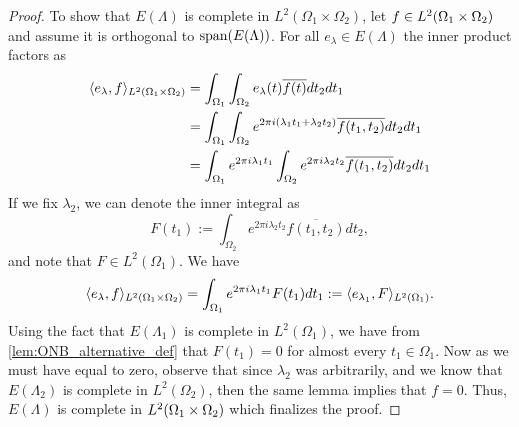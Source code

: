 \documentclass[../thesis.tex]{subfiles}
\begin{document}
\begin{proof}
    To show that $E(\Lambda)$ is complete in $L^2(\Omega_1 \times \Omega_2)$, let $f\in L^2(\Omega_1 \times \Omega_2)$ and assume it is orthogonal to $\operatorname{span}(E(\Lambda))$. For all $e_\lambda \in E(\Lambda)$ the inner product factors as
    \begin{align*} %
        \braa{e_\lambda,f}_{L^2\brac{\Omega_1 \times \Omega_2}}
        &= \int_{\Omega_1} \int_{\Omega_2} e_\lambda(t) \overline{f(t)} dt_2dt_1 \\
        &= \int_{\Omega_1} \int_{\Omega_2} e^{2\pi i  (\lambda_1 t_1 + \lambda_2 t_2)} \overline{f(t_1,t_2)} dt_2 dt_1 \\
        &= \int_{\Omega_1} e^{2 \pi i \lambda_1 t_1} \int_{\Omega_2}e^{2 \pi i \lambda_2 t_2} \overline{f(t_1,t_2)} dt_2 dt_1 \\
    \end{align*}
    If we fix $\lambda_2$, we can denote the inner integral as 
    \begin{equation}\label{eq:inner_eq}
        F(t_1) := \int_{\Omega_2} e^{2 \pi i \lambda_2 t_2} \overline{f(t_1,t_2)} dt_2,
    \end{equation}
    and note that $F\in L^2(\Omega_1)$. We have 
    \begin{equation}\label{eq:outter_eq}
        \langle e_{\lambda}, f\rangle_{L^2(\Omega_1\times \Omega_2)} = \int_{\Omega_1} e^{2 \pi i \lambda_1 t_1} F(t_1) dt_1 := \langle e_{\lambda_1}, F\rangle_{L^2(\Omega_1)}.
    \end{equation}
    Using the fact that $E(\Lambda_1)$ is complete in $L^2(\Omega_1)$, we have from \cref{lem:ONB_alternative_def} that $F(t_1)=0$ for almost every $t_1 \in \Omega_1$. Now as we must have  equal to zero, observe that since $\lambda_2$ was arbitrarily, and we know that $E(\Lambda_2)$ is complete in $L^2(\Omega_2)$, then the same lemma implies that $f=0$. Thus, $E(\Lambda)$ is complete in $L^2(\Omega_1 \times \Omega_2)$ which finalizes the proof.
\end{proof}
\end{document}
